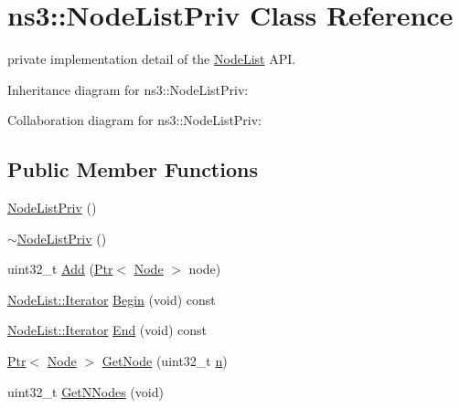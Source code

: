 \hypertarget{classns3_1_1NodeListPriv}{}\section{ns3\+:\+:Node\+List\+Priv Class Reference}
\label{classns3_1_1NodeListPriv}


private implementation detail of the \hyperlink{classns3_1_1NodeList}{Node\+List} A\+PI.  




Inheritance diagram for ns3\+:\+:Node\+List\+Priv\+:


Collaboration diagram for ns3\+:\+:Node\+List\+Priv\+:
\subsection*{Public Member Functions}
\begin{DoxyCompactItemize}
\item 
\hyperlink{classns3_1_1NodeListPriv_a0ea60967b92df9251b939fdfd7061698}{Node\+List\+Priv} ()
\item 
\hyperlink{classns3_1_1NodeListPriv_a565572bbdcb6109d93a5767781c2911d}{$\sim$\+Node\+List\+Priv} ()
\item 
uint32\+\_\+t \hyperlink{classns3_1_1NodeListPriv_ab1f9d5bb7832f565dcd76b1ca7b93d58}{Add} (\hyperlink{classns3_1_1Ptr}{Ptr}$<$ \hyperlink{classns3_1_1Node}{Node} $>$ node)
\item 
\hyperlink{classns3_1_1NodeList_a9e2679a94efb4f0066cc21e65440364d}{Node\+List\+::\+Iterator} \hyperlink{classns3_1_1NodeListPriv_a21c3f8d140c8c96365c7fb3370332b1b}{Begin} (void) const 
\item 
\hyperlink{classns3_1_1NodeList_a9e2679a94efb4f0066cc21e65440364d}{Node\+List\+::\+Iterator} \hyperlink{classns3_1_1NodeListPriv_a42b4046ee8be57ea2966ba467e4679e0}{End} (void) const 
\item 
\hyperlink{classns3_1_1Ptr}{Ptr}$<$ \hyperlink{classns3_1_1Node}{Node} $>$ \hyperlink{classns3_1_1NodeListPriv_a545589f09d44e59940162e9fdcbb170a}{Get\+Node} (uint32\+\_\+t \hyperlink{lte__link__budget__x2__handover__measures_8m_abdb05bc5a064cf642a06c83b3392f148}{n})
\item 
uint32\+\_\+t \hyperlink{classns3_1_1NodeListPriv_a32d0a94f47f8d987ca9566bf228f431d}{Get\+N\+Nodes} (void)
\end{DoxyCompactItemize}
